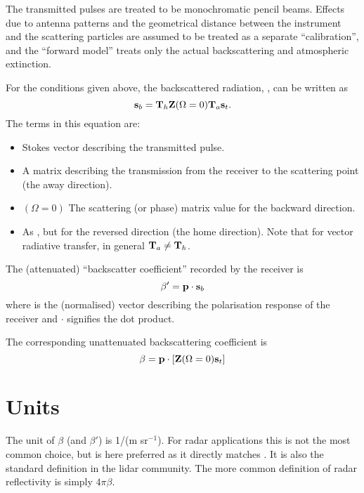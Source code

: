 The transmitted pulses are treated to be monochromatic pencil beams. Effects
due to antenna patterns and the geometrical distance between the instrument and
the scattering particles are assumed to be treated as a separate
``calibration'', and the ``forward model'' treats only the actual
backscattering and atmospheric extinction. 

For the conditions given above, the backscattered radiation, , can be
written as
\begin{equation}
  \label{eq:cradar:bscatt1}
  {\bf s}_{b} = {\bf T}_{h}{\bf Z}(\Omega=0){\bf T}_{a}{\bf s}_{t}.
\end{equation}
The terms in this equation are:
\begin{itemize}
\item[\aStoVec{t}] Stokes vector describing the transmitted pulse.
\item[\aTraMat{a}] A matrix describing the transmission from the receiver to
  the scattering point (the away direction). 
\item[\PhaMat]$\!\!\!(\Omega=0)$ The scattering (or phase) matrix value for the
  backward direction. 
\item[\aTraMat{h}] As , but for the reversed direction (the home
  direction). Note that for vector radiative transfer, in general
  ${\bf T}_{a}\neq{\bf T}_{h}$.
\end{itemize}
The (attenuated) ``backscatter coefficient'' recorded by the receiver is
\begin{equation}
  \label{eq:cradar:bscatt2}
  \beta' = \mathbf{p} \cdot {\bf s}_{b} 
\end{equation}
where  is the (normalised) vector describing the polarisation
response of the receiver and $\cdot$ signifies the dot product.

The corresponding unattenuated backscattering coefficient is
\begin{equation}
  \label{eq:cradar:bscatt3}
  \beta = \mathbf{p} \cdot \left[{\bf Z}(\Omega=0){\bf s}_{t}\right]
\end{equation}


\section{Units}
\label{sec:cradar:units}

The unit of $\beta$ (and $\beta'$) is 1/(m sr$^{-1}$). For radar applications
this is not the most common choice, but is here preferred as it directly
matches \PhaMat. It is also the standard definition in the lidar community. The
more common definition of radar reflectivity is simply $4\pi\beta$.

